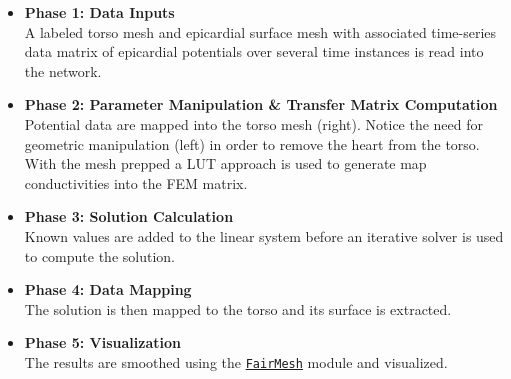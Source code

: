\begin{itemize}
\item {\bf Phase 1: Data Inputs} \\
A labeled torso mesh and epicardial surface mesh with associated time-series data matrix of epicardial potentials over several time instances is read into the network.
\item {\bf Phase 2: Parameter Manipulation \& Transfer Matrix Computation} \\
Potential data are mapped into the torso mesh (right). Notice the need for geometric manipulation (left) in order to remove the heart from the torso. With the mesh prepped a LUT approach is used to generate map conductivities into the FEM matrix.
\item {\bf Phase 3: Solution Calculation} \\
Known values are added to the linear system before an iterative solver is used to compute the solution.
\item {\bf Phase 4: Data Mapping} \\
The solution is then mapped to the torso and its surface is extracted.
\item {\bf Phase 5: Visualization} \\
The results are smoothed using the \href{http://sciinstitute.github.io/scirun.pages/modules.html#FairMesh}{\tt FairMesh} module and visualized.
\end{itemize}

